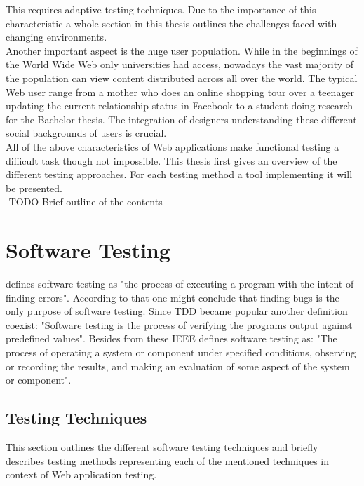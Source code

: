 \documentclass[12pt, notitlepage]{article}
\begin{document}
This requires adaptive testing techniques. Due to the importance of this characteristic a whole section in this thesis outlines the challenges faced
with changing environments.\\ 
Another important aspect is the huge user population. While in the beginnings of the World Wide Web only universities had access,
nowadays the vast majority of the population can view content distributed across all over the world. The typical Web user range from a
mother who does an online shopping tour over a teenager updating the current relationship status in Facebook to a student doing research for
the Bachelor thesis. The integration of designers understanding these different social backgrounds of users is crucial.\\


All of the above characteristics of Web applications make functional testing a difficult task though not impossible.
This thesis first gives an overview of the different testing approaches. For each 
testing method a tool implementing it will be presented.\\
-TODO Brief outline of the contents-
\newpage


\section{Software Testing}
\cite{art-of-software-testing} defines software testing as "the process of executing a program with the intent of finding errors".
According to that one might conclude that finding bugs is the only purpose of software testing. Since TDD\cite{tdd} became popular
another definition coexist: "Software testing is the process of verifying the programs output against predefined values". Besides from 
these IEEE\cite{ieee-testing-definiton} defines software testing as: "The process of operating a system or component under specified conditions, observing or recording the results, and making an evaluation of some aspect of the system or component".\\
\subsection{Testing Techniques}
This section outlines the different software testing techniques\cite{testing-methods} and briefly describes testing methods representing each of
the mentioned techniques in context of Web application testing.
\end{document}
